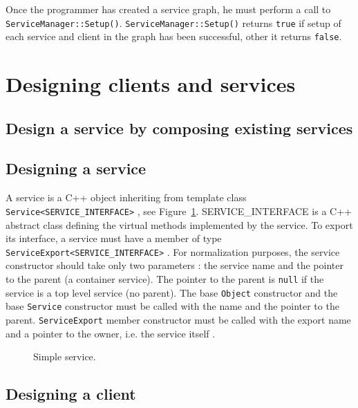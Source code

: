 Once \hfill the \hfill programmer \hfill has \hfill created \hfill a \hfill service \hfill graph, \hfill he \hfill must \hfill perform \hfill a \hfill call \hfill to \hfill \texttt{ServiceManager::Setup()}.
\texttt{ServiceManager::Setup()} returns \texttt{true} if setup of each service and client in the graph has been successful, other it returns \texttt{false}.

\section{Designing clients and services}
\label{designing_clients_and_services}

\subsection{Design a service by composing existing services}

\subsection{Designing a service}

A service is a C++ object inheriting from template class \texttt{Service<SERVICE\_INTERFACE>} , see Figure~\ref{fig:simple_service}.
SERVICE\_INTERFACE is a C++ abstract class defining the virtual methods implemented by the service.
To export its interface, a service must have a member of type \texttt{ServiceExport<SERVICE\_INTERFACE>} .
For normalization purposes, the service constructor should take only two parameters : the service name and the pointer to the parent (a container service).
The pointer to the parent is \texttt{null} if the service is a top level service (no parent).
The base \texttt{Object} constructor  and the base \texttt{Service} constructor  must be called with the name and the pointer to the parent.
\texttt{ServiceExport} member constructor must be called with the export name and a pointer to the owner, i.e. the service itself .

\begin{figure}[h]
  \begin{center}
    
    \caption{\label{fig:simple_service} Simple service.}
  \end{center}
\end{figure}


\subsection{Designing a client}

